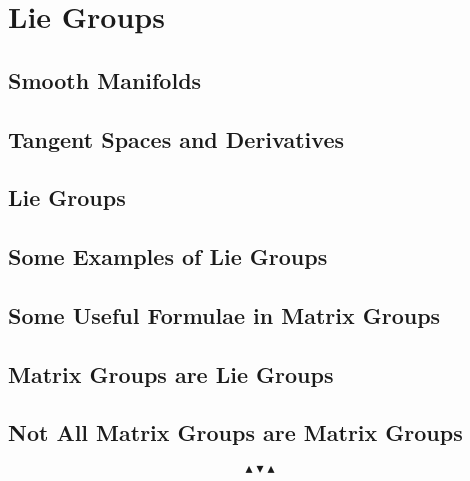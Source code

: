 \chapter{Lie Groups}

\section{Smooth Manifolds}

\section{Tangent Spaces and Derivatives}

\section{Lie Groups}

\section{Some Examples of Lie Groups}

\section{Some Useful Formulae in Matrix Groups}

\section{Matrix Groups are Lie Groups}

\section{Not All Matrix Groups are Matrix Groups}


\[ \blacktriangle \blacktriangledown \blacktriangle \]
